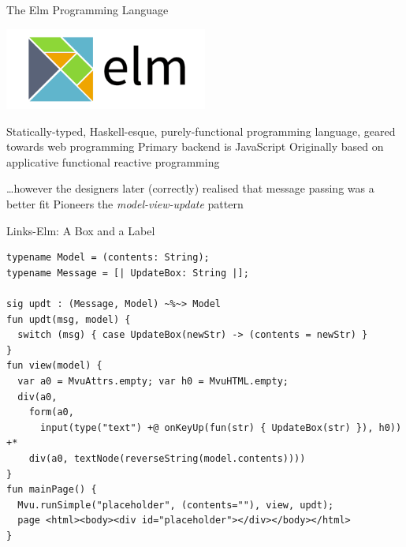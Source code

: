 \documentclass[11.5pt, aspectratio=169]{beamer}
\begin{document}
\begin{frame}{The Elm Programming Language}

  \begin{center}
    \includegraphics[width=0.5\textwidth]{images/ElmLogo.png}
  \end{center}

  \begin{fullpageitemize}
  \itemR Statically-typed, Haskell-esque, purely-functional programming language, geared towards web programming
  \itemR Primary backend is JavaScript
  \itemR Originally based on applicative functional reactive programming
    \begin{itemize}
      \itemR \ldots however the designers later (correctly) realised that message passing was a better fit
      \itemR Pioneers the \emph{model-view-update} pattern
    \end{itemize}
  \end{fullpageitemize}

\end{frame}

\begin{frame}[fragile]{Links-Elm: A Box and a Label}

\begin{lstlisting}[language=links]
typename Model = (contents: String);
typename Message = [| UpdateBox: String |];

sig updt : (Message, Model) ~%~> Model
fun updt(msg, model) {
  switch (msg) { case UpdateBox(newStr) -> (contents = newStr) }
}
fun view(model) {
  var a0 = MvuAttrs.empty; var h0 = MvuHTML.empty;
  div(a0,
    form(a0,
      input(type("text") +@ onKeyUp(fun(str) { UpdateBox(str) }), h0)) +*
    div(a0, textNode(reverseString(model.contents))))
}
fun mainPage() {
  Mvu.runSimple("placeholder", (contents=""), view, updt);
  page <html><body><div id="placeholder"></div></body></html>
}
\end{lstlisting}
\end{frame}
\end{document}
